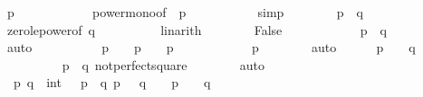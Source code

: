 \begin{isabellebody}
\ {\isachardoublequoteopen}p{\isacharcircum}{}\ {\isasymge}\ {}{\isachardoublequoteclose}\isanewline
\ \ \ \ \ \ \ \ \isamarkupfalse%
\ power{\isacharunderscore}mono{\isacharbrackleft}of\ {}\ p\ {}{\isacharbrackright}\isanewline
\ \ \ \ \ \ \ \ \isamarkupfalse%
\ simp\isanewline
\ \ \ \ \ \ \isamarkupfalse%
\ {\isachardoublequoteopen}p{\isacharcircum}{}\ {\isacharplus}\ q{\isacharcircum}{}\ {\isasymge}\ {}{\isachardoublequoteclose}\isanewline
\ \ \ \ \ \ \ \ \isamarkupfalse%
\ zero{\isacharunderscore}le{\isacharunderscore}power{}{\isacharbrackleft}of\ q{\isacharbrackright}\isanewline
\ \ \ \ \ \ \ \ \isamarkupfalse%
\ linarith\isanewline
\ \ \ \ \ \ \isamarkupfalse%
\ False\isanewline
\ \ \ \ \ \ \ \ \isamarkupfalse%
\ {\isacharbackquoteopen}{}\ {\isacharequal}\ p{\isacharcircum}{}\ {\isacharplus}\ q{\isacharcircum}{}{\isacharbackquoteclose}\isanewline
\ \ \ \ \ \ \ \ \isamarkupfalse%
\ auto\isanewline
\ \ \ \ \isamarkupfalse%
\isanewline
\ \ \ \ \isamarkupfalse%
\ {\isachardoublequoteopen}p\ {\isacharequal}\ {}\ {\isasymor}\ p\ {\isacharequal}\ {}\ {\isasymor}\ p\ {\isacharequal}\ {}{\isachardoublequoteclose}\isanewline
\ \ \ \ \ \ \isamarkupfalse%
\ {\isacharbackquoteopen}{}\ {\isasymle}\ p{\isacharbackquoteclose}\isanewline
\ \ \ \ \ \ \isamarkupfalse%
\ auto\isanewline
\ \ \ \ \isamarkupfalse%
\ {\isachardoublequoteopen}p\ {\isacharequal}\ {}\ {\isasymor}\ q\ {\isacharequal}\ {}{\isachardoublequoteclose}\isanewline
\ \ \ \ \ \ \isamarkupfalse%
\ {\isacharbackquoteopen}{}\ {\isacharequal}\ p{\isacharcircum}{}\ {\isacharplus}\ q{\isacharcircum}{}{\isacharbackquoteclose}\ not{\isacharunderscore}perfect{\isacharunderscore}square{\isacharunderscore}{}\isanewline
\ \ \ \ \ \ \isamarkupfalse%
\ auto\isanewline
\ \ \isamarkupfalse%
\isanewline
\ \ \isamarkupfalse%
\isanewline
\ \ \isamarkupfalse%
\ {\isachardoublequoteopen}{\isasymAnd}\ p\ q\ {\isacharcolon}{\isacharcolon}\ int{\isachardot}\ {\isasymlbrakk}{}\ {\isacharequal}\ p{\isacharcircum}{}\ {\isacharplus}\ q{\isacharcircum}{}{\isacharsemicolon}\ p\ {\isasymge}\ {}{\isacharsemicolon}\ q\ {\isasymge}\ {}{\isasymrbrakk}\ {\isasymLongrightarrow}\ p\ {\isacharequal}\ {}\ {\isasymor}\ q\ {\isacharequal}\ {}{\isachardoublequoteclose}\isanewline

\end{isabellebody}
